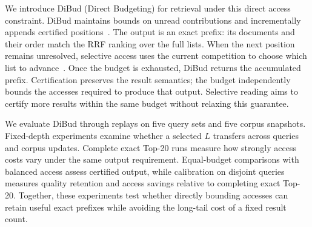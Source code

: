 We introduce DiBud (Direct Budgeting) for retrieval under this direct access constraint. DiBud maintains bounds on unread contributions and incrementally appends certified positions~\cite{lara}. The output is an exact prefix: its documents and their order match the RRF ranking over the full lists. When the next position remains unresolved, selective access uses the current competition to choose which list to advance~\cite{snra}. Once the budget is exhausted, DiBud returns the accumulated prefix. Certification preserves the result semantics; the budget independently bounds the accesses required to produce that output. Selective reading aims to certify more results within the same budget without relaxing this guarantee.

We evaluate DiBud through replays on five query sets and five corpus snapshots. Fixed-depth experiments examine whether a selected \(L\) transfers across queries and corpus updates. Complete exact Top-20 runs measure how strongly access costs vary under the same output requirement. Equal-budget comparisons with balanced access assess certified output, while calibration on disjoint queries measures quality retention and access savings relative to completing exact Top-20. Together, these experiments test whether directly bounding accesses can retain useful exact prefixes while avoiding the long-tail cost of a fixed result count.
